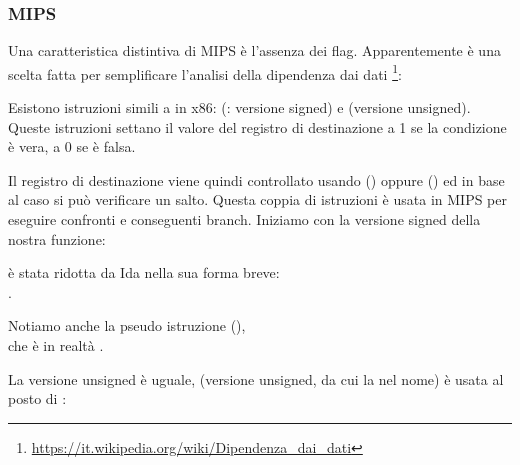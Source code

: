 \subsubsection{MIPS}

Una caratteristica distintiva di MIPS è l'assenza dei flag.
Apparentemente è una scelta fatta per semplificare l'analisi della dipendenza dai dati \footnote{\href{https://it.wikipedia.org/wiki/Dipendenza_dai_dati}{https://it.wikipedia.org/wiki/Dipendenza_dai_dati}}:


Esistono istruzioni simili a  in x86:  (: versione signed) e 
 (versione unsigned).
Queste istruzioni settano il valore del registro di destinazione a 1 se la condizione è vera, a 0 se è falsa.


Il registro di destinazione viene quindi controllato usando  () oppure  () 
ed in base al caso si può verificare un salto.
Questa coppia di istruzioni è usata in MIPS per eseguire confronti e conseguenti branch.
Iniziamo con la versione signed della nostra funzione:



 è stata ridotta da Ida nella sua forma breve:\\
.

Notiamo anche la pseudo istruzione  (),\\
che è in realtà .


La versione unsigned è uguale,  (versione unsigned, da cui la  nel nome) è usata al posto di :



